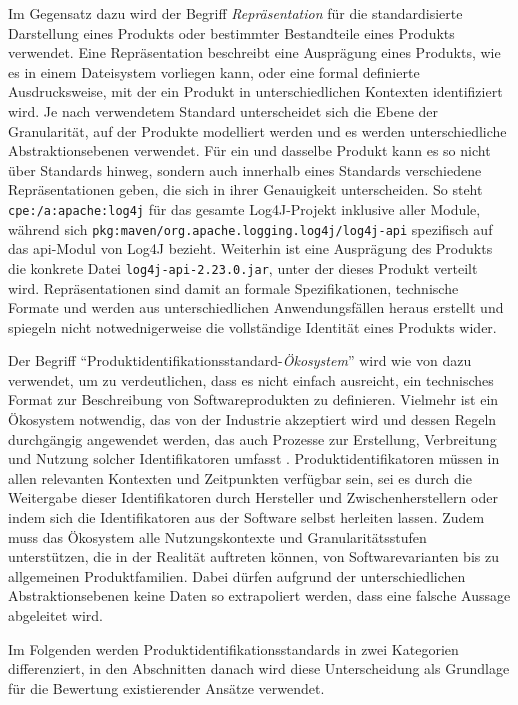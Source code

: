 Im Gegensatz dazu wird der Begriff \textit{Repräsentation} für die standardisierte Darstellung eines Produkts oder bestimmter Bestandteile eines Produkts verwendet.
Eine Repräsentation beschreibt eine Ausprägung eines Produkts, wie es in einem Dateisystem vorliegen kann, oder eine formal definierte Ausdrucksweise, mit der ein Produkt in unterschiedlichen Kontexten identifiziert wird.
Je nach verwendetem Standard unterscheidet sich die Ebene der Granularität, auf der Produkte modelliert werden und es werden unterschiedliche Abstraktionsebenen verwendet.
Für ein und dasselbe Produkt kann es so nicht über Standards hinweg, sondern auch innerhalb eines Standards verschiedene Repräsentationen geben, die sich in ihrer Genauigkeit unterscheiden.
So steht \texttt{cpe:/a:apache:log4j} für das gesamte Log4J-Projekt inklusive aller Module, während sich \texttt{pkg:maven/org.apache.logging.log4j/log4j-api} spezifisch auf das \acrshort{api}-Modul von Log4J bezieht.
Weiterhin ist eine Ausprägung des Produkts die konkrete Datei \texttt{log4j-api-2.23.0.jar}, unter der dieses Produkt verteilt wird.
Repräsentationen sind damit an formale Spezifikationen, technische Formate und werden aus unterschiedlichen Anwendungsfällen heraus erstellt und spiegeln nicht notwednigerweise die vollständige Identität eines Produkts wider.

Der Begriff \enquote{Produktidentifikationsstandard-\textit{Ökosystem}} wird wie von \citeauthor{CISA2023} dazu verwendet, um zu verdeutlichen, dass es nicht einfach ausreicht, ein technisches Format zur Beschreibung von Softwareprodukten zu definieren.
Vielmehr ist ein Ökosystem notwendig, das von der Industrie akzeptiert wird und dessen Regeln durchgängig angewendet werden, das auch Prozesse zur Erstellung, Verbreitung und Nutzung solcher Identifikatoren umfasst \autocite{CISA2023}.
Produktidentifikatoren müssen in allen relevanten Kontexten und Zeitpunkten verfügbar sein, sei es durch die Weitergabe dieser Identifikatoren durch Hersteller und Zwischenherstellern oder indem sich die Identifikatoren aus der Software selbst herleiten lassen.
Zudem muss das Ökosystem alle Nutzungskontexte und Granularitätsstufen unterstützen, die in der Realität auftreten können, von Softwarevarianten bis zu allgemeinen Produktfamilien.
Dabei dürfen aufgrund der unterschiedlichen Abstraktionsebenen keine Daten so extrapoliert werden, dass eine falsche Aussage abgeleitet wird.

Im Folgenden werden Produktidentifikationsstandards in zwei Kategorien differenziert, in den Abschnitten danach wird diese Unterscheidung als Grundlage für die Bewertung existierender Ansätze verwendet.

